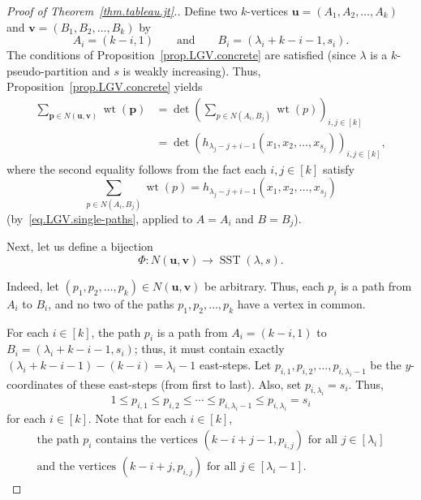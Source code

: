 \documentclass[reqno]{amsart}
\newcommand{\0}{\phantom{c}}
\DeclareMathOperator{\wt}{wt} %
\DeclareMathOperator{\SST}{SST} %
\newcommand{\pp}{\mathbf{p}}
\newcommand{\uu}{\mathbf{u}}
\newcommand{\vv}{\mathbf{v}}
\let\sumnonlimits\sum
\renewcommand{\sum}{\sumnonlimits\limits}
\newcommand{\tup}[1]{\left( #1 \right)}
\newcommand{\ive}[1]{\left[ #1 \right]}
\theoremstyle{plain}
\theoremstyle{definition}
\numberwithin{equation}{section}
\begin{document}
\begin{proof}[Proof of Theorem~\ref{thm.tableau.jt}.]
Define two $k$-vertices $\uu = \tup{A_1, A_2, \dotsc, A_k}$ and $\vv = \tup{B_1, B_2, \dotsc, B_k}$ by
\[
A_i = (k-i,1)  \qquad \text{and} \qquad B_i = (\lambda_i+k-i-1, s_i).
\]
The conditions of Proposition~\ref{prop.LGV.concrete} are satisfied (since $\lambda$ is a $k$-pseudo-partition and $s$ is weakly increasing).
Thus, Proposition~\ref{prop.LGV.concrete} yields
\begin{equation}
\label{pf.thm.tableau.jt.1}
\begin{split}
\sum_{\pp \in N(\uu,\vv)} \wt(\pp) & = \det\left(  \sum_{p \in  N(A_i,B_j)}\wt(p) \right)_{i, j \in \ive{k}} \\
& = \det\left( h_{\lambda_j-j+i-1}(x_1, x_2, \dotsc, x_{s_j}) \right)_{i, j \in \ive{k}},
\end{split}
\end{equation}
where the second equality follows from the fact each $i,j \in \ive{k}$ satisfy
\[
\sum_{p \in N(A_i,B_j)} \wt(p) = h_{\lambda_j-j+i-1}(x_1, x_2, \dotsc, x_{s_j})
\]
(by~\eqref{eq.LGV.single-paths}, applied to $A = A_i$ and $B = B_j$). 

Next, let us define a bijection
\[
\Phi \colon N(\uu, \vv) \to \SST(\lambda, s).
\]

Indeed, let $\tup{p_1, p_2, \dotsc, p_k} \in N(\uu,\vv)$ be arbitrary.
Thus, each $p_i$ is a path from $A_i$ to $B_i$, and no two of the paths $p_1, p_2, \dotsc, p_k$ have a vertex in common.

For each $i \in \ive{k}$, the path $p_i$ is a path from $A_i = (k-i, 1)$ to $B_i = (\lambda_i+k-i-1,s_i)$; thus, it must contain exactly $(\lambda_i+k-i-1) - (k-i) = \lambda_i - 1$ east-steps.
Let $p_{i,1},p_{i,2}, \dotsc, p_{i,\lambda_i-1}$ be the $y$-coordinates of these east-steps (from first to last).
Also, set $p_{i,\lambda_i} = s_i$.
Thus,
\begin{equation}
\label{pf.thm.tableau.jt.row-weak}
1 \leq p_{i,1} \leq p_{i,2} \leq \cdots \leq p_{i,\lambda_i-1} \leq p_{i,\lambda_i} = s_i
\end{equation}
for each $i \in \ive{k}$.
Note that for each $i \in \ive{k}$,
\begin{subequations}
\begin{gather}
\label{pf.thm.tableau.jt.pi-vert-1}
\text{the path }p_i\text{ contains the vertices } (k-i+j-1, p_{i,j})  \text{ for all } j \in \ive{\lambda_i}
\\
\label{pf.thm.tableau.jt.pi-vert-2}
\text{and the vertices } (k-i+j, p_{i,j}) \text{ for all } j \in \ive{\lambda_i-1}.
\end{gather}
\end{subequations}


\end{proof}
\end{document}
